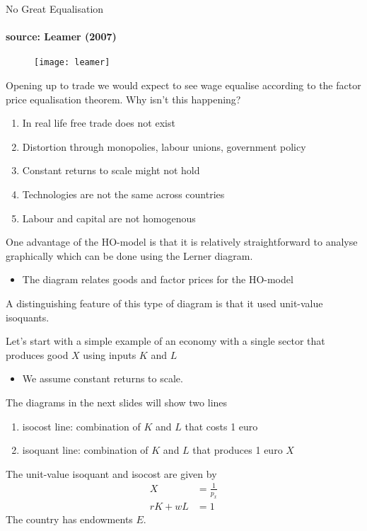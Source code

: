 \documentclass{beamer}
\begin{document}
\begin{frame}{No Great Equalisation}
\framesubtitle{source: Leamer (2007)}
  \begin{figure}
    \texttt{[image: leamer]}
  \end{figure}
\end{frame}

\begin{frame}
 Opening up to trade we would expect to see wage equalise according to the factor price equalisation theorem.
 Why isn't this happening?
 \medskip
 \begin{enumerate}
   \item In real life free trade does not exist
   \item Distortion through monopolies, labour unions, government policy
   \item Constant returns to scale might not hold
   \item Technologies are not the same across countries
   \item Labour and capital are not homogenous
 \end{enumerate}
\end{frame}

\begin{frame}
 One advantage of the HO-model is that it is relatively straightforward to analyse graphically which can be done using the Lerner diagram. 
 \begin{itemize}
   \item The diagram relates goods and factor prices for the HO-model
 \end{itemize}
 \medskip
 A distinguishing feature of this type of diagram is that it used unit-value isoquants.
\end{frame}

\begin{frame}
 Let's start with a simple example of an economy with a single sector that produces good $X$ using inputs $K$ and $L$
 \begin{itemize}
   \item We assume constant returns to scale.
 \end{itemize}
 \medskip
The diagrams in the next slides will show two lines
\begin{enumerate}
  \item isocost line: combination of $K$ and $L$ that costs 1 euro
  \item isoquant line: combination of $K$ and $L$ that produces 1 euro $X$
\end{enumerate}
\medskip
The unit-value isoquant and isocost are given by
\begin{align*}
X &=\frac{1}{p_x}\\
rK+wL&=1
\end{align*}
\medskip
The country has endowments $E$.
\end{frame}
\end{document}
